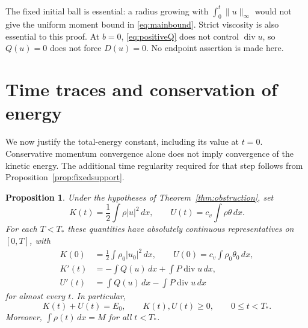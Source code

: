 \documentclass[11pt,letterpaper]{article}
\numberwithin{equation}{section}
\newtheorem{proposition}[theorem]{Proposition}
\theoremstyle{definition}
\newcommand{\dd}{\,dx}
\newcommand{\Div}{\operatorname{div}}
\newcommand{\norm}[2]{\lVert#1\rVert_{#2}}
\begin{document}
The fixed initial ball is essential: a radius growing with
$\int_0^t\norm{u}{\infty}$ would not give the uniform moment bound
in \eqref{eq:mainbound}. Strict viscosity is also essential to
this proof. At $b=0$, \eqref{eq:positiveQ} does not control
$\Div u$, so $Q(u)=0$ does not force $D(u)=0$. No endpoint
assertion is made here.

\section{Time traces and conservation of energy}\label{sec:energy}

We now justify the total-energy constant, including its value at
$t=0$. Conservative momentum convergence alone does not imply
convergence of the kinetic energy. The additional time regularity
required for that step follows from Proposition~\ref{prop:fixedsupport}.

\begin{proposition}\label{prop:energy}
Under the hypotheses of Theorem~\ref{thm:obstruction}, set
\[
 K(t)=\frac12\int\rho|u|^2\dd,\qquad
 U(t)=c_v\int\rho\theta\dd.
\]
For each $T<T_*$ these quantities have absolutely continuous
representatives on $[0,T]$, with
\begin{equation}
 \begin{aligned}
 K(0)&=\frac12\int\rho_0|u_0|^2\dd,\qquad
 U(0)=c_v\int\rho_0\theta_0\dd,\\
 K'(t)&=-\int Q(u)\dd+\int P\Div u\dd,\\
 U'(t)&=\int Q(u)\dd-\int P\Div u\dd
 \end{aligned}\label{eq:energyidentities}
\end{equation}
for almost every $t$. In particular,
\begin{equation}
 K(t)+U(t)=E_0,\qquad K(t),U(t)\ge0,\qquad 0\le t<T_*.
 \label{eq:energyconservation}
\end{equation}
Moreover, $\int\rho(t)\dd=M$ for all $t<T_*$.
\end{proposition}
\end{document}
